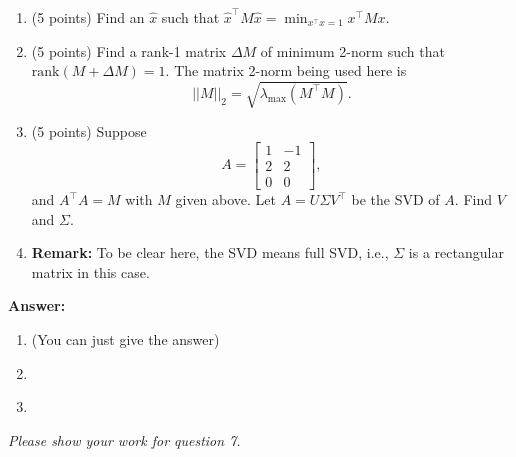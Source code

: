 \documentclass[letterpaper]{article}
\newcommand{\ds}{\displaystyle}
\begin{document}
\begin{enumerate}
    \setlength{\itemsep}{.15in}
    \renewcommand{\labelenumi}{(\alph{enumi})}
    \setlength{\itemsep}{.1in}
    \item (5 points)  Find an $\widehat{x}$ such that $\ds \widehat{x}^\top M \widehat{x} =\min_{x^\top x =1}x^\top M x$.

    \item (5 points)  Find a rank-1 matrix $\Delta M$ of minimum 2-norm such that $\mathrm{rank}(M+\Delta M)=1$. The matrix 2-norm being used here is
        \begin{equation*}
          ||M||_{2}=\sqrt{\lambda_{\max}(M^\top M)}.
        \end{equation*}

    \item (5 points)  Suppose
        \begin{equation*}
          A = \left[  \begin{array}{cc} 1 & -1 \\ 2 & 2\\0 & 0\end{array} \right],
        \end{equation*}
        and $A^\top A=M$ with $M$ given above. Let $A=U\Sigma V^\top$ be the SVD of $A$. Find $V$ and $\Sigma$.

    \item[] {\bf Remark:} To be clear here, the SVD means full SVD, i.e., $\Sigma$ is a rectangular matrix in this case.
\end{enumerate}
\noindent \textbf{Answer:}
\begin{enumerate}
    \setlength{\itemsep}{.15in}
    \renewcommand{\labelenumi}{(\alph{enumi})}
    \setlength{\itemsep}{.1in}
    \item {} (You can just give the answer)\\

    \item {}\\

    \item {}
\end{enumerate}


\newpage
\textit{Please show your work for question 7.}
\newpage
\end{document}
